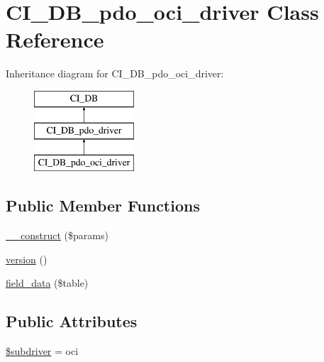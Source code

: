 \hypertarget{class_c_i___d_b__pdo__oci__driver}{}\section{C\+I\+\_\+\+D\+B\+\_\+pdo\+\_\+oci\+\_\+driver Class Reference}
\label{class_c_i___d_b__pdo__oci__driver}
Inheritance diagram for C\+I\+\_\+\+D\+B\+\_\+pdo\+\_\+oci\+\_\+driver\+:\begin{figure}[H]
\begin{center}
\leavevmode
\includegraphics[height=3.000000cm]{class_c_i___d_b__pdo__oci__driver}
\end{center}
\end{figure}
\subsection*{Public Member Functions}
\begin{DoxyCompactItemize}
\item 
\mbox{\hyperlink{class_c_i___d_b__pdo__oci__driver_a9162320adff1a1a4afd7f2372f753a3e}{\+\_\+\+\_\+construct}} (\$params)
\item 
\mbox{\hyperlink{class_c_i___d_b__pdo__oci__driver_a6080dae0886626b9a4cedb29240708b1}{version}} ()
\item 
\mbox{\hyperlink{class_c_i___d_b__pdo__oci__driver_a90355121e1ed009e0efdbd544ab56efa}{field\+\_\+data}} (\$table)
\end{DoxyCompactItemize}
\subsection*{Public Attributes}
\begin{DoxyCompactItemize}
\item 
\mbox{\hyperlink{class_c_i___d_b__pdo__oci__driver_a1322ca756348b11d080cb7a4f590de15}{\$subdriver}} = \textquotesingle{}oci\textquotesingle{}
\end{DoxyCompactItemize}
